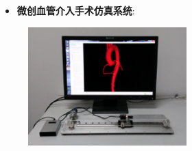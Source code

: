 \begin{frame}
\begin{itemize}
  \item \textbf{微创血管介入手术仿真系统}: 
\end{itemize}
\begin{figure}[t]
\centering
\includegraphics[height=130pt]{../../Figures/background/simulator.eps}
\end{figure}
% 
\end{frame}

